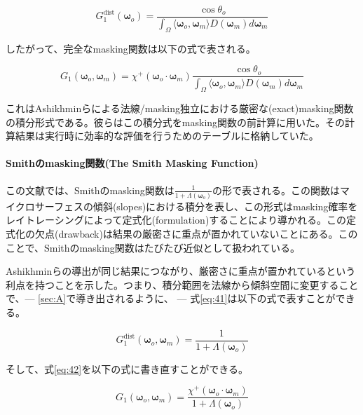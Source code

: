\documentclass[a4j,xelatex,ja=standard]{bxjsarticle}
\begin{document}
\begin{equation}
    G_1^{\text{dist}}(\boldsymbol{\omega}_o) = \frac{\cos\theta_o}{\int_{\Omega} \langle \boldsymbol{\omega}_o, \boldsymbol{\omega}_m \rangle D(\boldsymbol{\omega}_m) d\boldsymbol{\omega}_m}
    \label{eq:41}
\end{equation}

したがって、完全なmasking関数は以下の式で表される。

\begin{equation}
    \boxed{
    G_1(\boldsymbol{\omega}_o, \boldsymbol{\omega}_m) = \chi^+(\boldsymbol{\omega}_o \cdot \boldsymbol{\omega}_m) \frac{\cos\theta_o}{\int_{\Omega} \langle \boldsymbol{\omega}_o, \boldsymbol{\omega}_m \rangle D(\boldsymbol{\omega}_m) d\boldsymbol{\omega}_m}
    }
    \label{eq:42}
\end{equation}

これはAshikhminらによる法線/masking独立における厳密な(exact)masking関数の積分形式である。彼らはこの積分式をmasking関数の前計算に用いた。その計算結果は実行時に効率的な評価を行うためのテーブルに格納していた。

\paragraph{Smithのmasking関数(The Smith Masking Function)}

この文献では、Smithのmasking関数は$\frac{1}{1 + \Lambda(\boldsymbol{\omega}_o)}$の形で表される。この関数はマイクロサーフェスの傾斜(slopes)における積分を表し、この形式はmasking確率をレイトレーシングによって定式化(formulation)することにより導かれる。この定式化の欠点(drawback)は結果の厳密さに重点が置かれていないことにある。このことで、Smithのmasking関数はたびたび近似として扱われている。

Ashikhminらの導出が同じ結果につながり、厳密さに重点が置かれているという利点を持つことを示した。つまり、積分範囲を法線から傾斜空間に変更することで、--- \ref{sec:A}で導き出されるように、 --- 式\eqref{eq:41}は以下の式で表すことができる。

\begin{equation*}
    G_1^{\text{dist}}(\boldsymbol{\omega}_o, \boldsymbol{\omega}_m) = \frac{1}{1 + \Lambda(\boldsymbol{\omega}_o)}
\end{equation*}

そして、式\eqref{eq:42}を以下の式に書き直すことができる。

\begin{equation}
    \boxed{
    G_1(\boldsymbol{\omega}_o, \boldsymbol{\omega}_m) = \frac{\chi^+(\boldsymbol{\omega}_o \cdot \boldsymbol{\omega}_m)}{1 + \Lambda(\boldsymbol{\omega}_o)}
    }
    \label{eq:43}
\end{equation}
\end{document}
